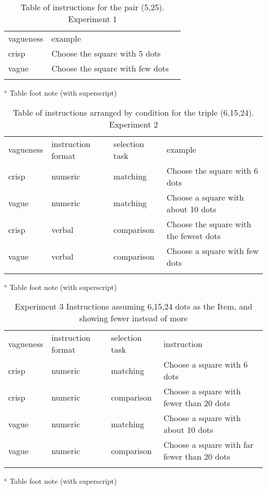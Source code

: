 \begin{table}
\caption{Table of instructions for the pair (5,25). Experiment 1}
\label{instructionse1} 
\begin{tabular}{lll}
\hline\noalign{\smallskip}
vagueness&example\\
\noalign{\smallskip}\svhline\noalign{\smallskip}
crisp 	& 	Choose the square with 5 dots \\
vague	&	Choose the square with few dots\\
\noalign{\smallskip}\hline\noalign{\smallskip}
\end{tabular}
$^a$ Table foot note (with superscript)\\
\end{table}

\begin{table}
\caption{Table of instructions arranged by condition for the triple (6,15,24). Experiment 2}
\label{instructionse2} 
\begin{tabular}{llll}
\hline\noalign{\smallskip}
vagueness&instruction format&selection task&example\\
\noalign{\smallskip}\svhline\noalign{\smallskip}
crisp 	& 	numeric	& matching	&	Choose the square with 6 dots \\
vague	&	numeric 	& matching	&	Choose a square with about 10 dots\\
crisp		&	verbal	& comparison	&	Choose the square with the fewest dots\\
vague	&	verbal	& comparison	&	Choose a square with few dots\\
\noalign{\smallskip}\hline\noalign{\smallskip}
\end{tabular}
$^a$ Table foot note (with superscript)\\
\end{table}

\begin{table}
\caption{Experiment 3 Instructions assuming 6,15,24 dots as the Item, and showing fewer instead of more}
\label{instructionse3} 
\begin{tabular}{llll}
\hline\noalign{\smallskip}
vagueness&instruction format&selection task&instruction\\
\noalign{\smallskip}\svhline\noalign{\smallskip}
crisp 	& numeric		&matching 	& Choose a square with 6 dots \\ 
crisp 	& numeric		&comparison 	& Choose a square with fewer than 20 dots \\
vague 	& numeric		&matching 	& Choose a square with about 10 dots \\ 
vague 	& numeric		&comparison 	& Choose a square with far fewer than 20 dots \\ 
\noalign{\smallskip}\hline\noalign{\smallskip}
\end{tabular}
$^a$ Table foot note (with superscript)\\
\end{table}

